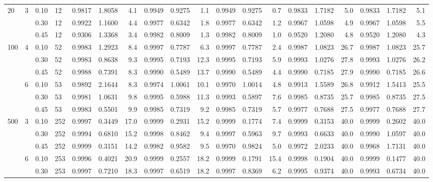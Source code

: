 \documentclass[thesis=B,english]{FITthesis}[2012/10/20]
\begin{document}
\begin{table}[h!]
\begin{adjustbox}{angle=90}
{\begin{tabular}{l|l|l|l|r|r|r|r|r|r|r|r|r|r|r|r|r|r|r|}
			20  & 3 & 0.10 & 12  &   0.9817 &  1.8058 &   4.1 &           0.9949 &  0.9275 &   1.1 &           0.9949 &  0.9275 &   0.7 &  0.9833 &  1.7182 &   5.0 &  0.9833 &  1.7182 &   5.1 \\    &   & 0.30 & 12  &   0.9922 &  1.1600 &   4.4 &           0.9977 &  0.6342 &   1.8 &           0.9977 &  0.6342 &   1.2 &  0.9967 &  1.0598 &   4.9 &  0.9967 &  1.0598 &   5.5 \\    &   & 0.45 & 12  &   0.9306 &  1.3368 &   3.4 &           0.9982 &  0.8009 &   1.3 &           0.9982 &  0.8009 &   1.0 &  0.9520 &  1.2080 &   4.8 &  0.9520 &  1.2080 &   4.3 \\100 & 4 & 0.10 & 52  &   0.9983 &  1.2923 &   8.4 &           0.9997 &  0.7787 &   6.3 &           0.9997 &  0.7787 &   2.4 &  0.9987 &  1.0823 &  26.7 &  0.9987 &  1.0823 &  25.7 \\    &   & 0.30 & 52  &   0.9983 &  0.8638 &   9.3 &           0.9995 &  0.7193 &  12.3 &           0.9995 &  0.7193 &   5.9 &  0.9993 &  1.0276 &  27.8 &  0.9993 &  1.0276 &  26.2 \\    &   & 0.45 & 52  &   0.9988 &  0.7391 &   8.3 &           0.9990 &  0.5489 &  13.7 &           0.9990 &  0.5489 &   4.4 &  0.9990 &  0.7185 &  27.9 &  0.9990 &  0.7185 &  26.6 \\    & 6 & 0.10 & 53  &   0.9892 &  2.1644 &   8.3 &           0.9974 &  1.0061 &  10.1 &           0.9970 &  1.0014 &   4.8 &  0.9913 &  1.5589 &  26.8 &  0.9912 &  1.5413 &  25.5 \\    &   & 0.30 & 53  &   0.9981 &  1.0631 &   9.8 &           0.9995 &  0.5988 &  11.3 &           0.9993 &  0.5897 &   7.6 &  0.9985 &  0.8735 &  25.7 &  0.9985 &  0.8735 &  27.5 \\    &   & 0.45 & 53  &   0.9983 &  0.5501 &   9.9 &           0.9985 &  0.7319 &   9.2 &           0.9985 &  0.7319 &   5.7 &  0.9977 &  0.7688 &  27.5 &  0.9977 &  0.7688 &  27.7 \\500 & 3 & 0.10 & 252 &   0.9997 &  0.3449 &  17.0 &           0.9999 &  0.2931 &  15.2 &           0.9999 &  0.1774 &   7.4 &  0.9999 &  0.3153 &  40.0 &  0.9999 &  0.2602 &  40.0 \\    &   & 0.30 & 252 &   0.9994 &  0.6810 &  15.2 &           0.9998 &  0.8462 &   9.4 &           0.9997 &  0.5963 &   9.7 &  0.9993 &  0.6633 &  40.0 &  0.9990 &  1.0597 &  40.0 \\    &   & 0.45 & 252 &   0.9999 &  0.3151 &  14.2 &           0.9982 &  0.9582 &   9.5 &           0.9970 &  0.9824 &   5.0 &  0.9972 &  2.0233 &  40.0 &  0.9968 &  1.7131 &  40.0 \\    & 6 & 0.10 & 253 &   0.9996 &  0.4021 &  20.9 &           0.9999 &  0.2557 &  18.2 &           0.9999 &  0.1791 &  15.4 &  0.9998 &  0.1904 &  40.0 &  0.9999 &  0.1477 &  40.0 \\    &   & 0.30 & 253 &   0.9997 &  0.7210 &  18.3 &           0.9997 &  0.6519 &  18.2 &           0.9997 &  0.8369 &   6.2 &  0.9995 &  0.9374 &  40.0 &  0.9993 &  0.6734 &  40.0 \\
			 \hline 
			\end{tabular} 
			}
			

\end{adjustbox}
\end{table}
\end{document}
